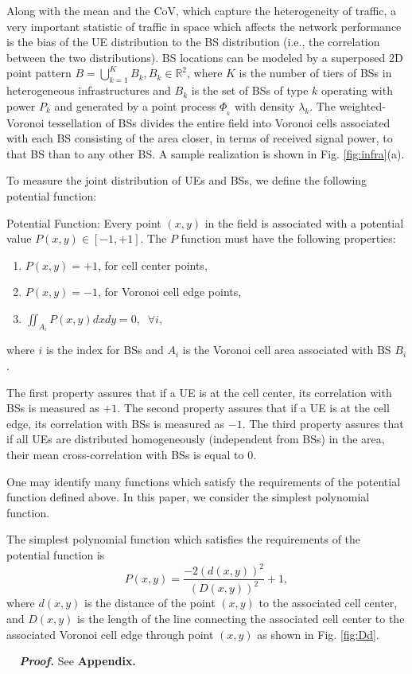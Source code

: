 \documentclass[journal]{IEEEtran}
\begin{document}
Along with the mean and the CoV, which capture the heterogeneity of traffic, a very important statistic of traffic in space which affects the network performance is the bias of the UE distribution to the BS distribution (i.e., the correlation between the two distributions). BS locations can be modeled by a superposed 2D point pattern $B = \bigcup_{k=1}^{K} B_k, B_k \in \mathbb{R}^{2}$, where $K$ is the number of tiers of BSs in heterogeneous infrastructures and $B_k$ is the set of BSs of type $k$ operating with power $P_k$ and generated by a point process $\Phi_{_{k}}$ with density $\lambda_k$. The weighted-Voronoi tessellation of BSs divides the entire field into Voronoi cells associated with each BS consisting of the area closer, in terms of received signal power, to that BS than to any other BS. A sample realization is shown in Fig. \ref{fig:infra}(a).

To measure the joint distribution of UEs and BSs, we define the following potential function:
\begin{definition}
Potential Function: Every point $(x,y)$ in the field is associated with a potential value $P(x,y) \in \left [ -1, +1 \right ]$. The $P$ function must have the following properties:
\begin{enumerate}
\item $P(x,y) = +1$, for cell center points, 
\item $P(x,y) = -1$, for Voronoi cell edge points,
\item $\iint_{A_{i}}P(x,y)dxdy = 0, \;\; \forall i$,
\end{enumerate}
where $i$ is the index for BSs and $A_{i}$ is the Voronoi cell area associated with BS $B_{i}$.
\end{definition} 

The first property assures that if a UE is at the cell center, its correlation with BSs is measured as $+1$. The second property assures that if a UE is at the cell edge, its correlation with BSs is measured as $-1$. The third property assures that if all UEs are distributed homogeneously (independent from BSs) in the area, their mean cross-correlation with BSs is equal to $0$.

One may identify many functions which satisfy the requirements of the potential function defined above. In this paper, we consider the simplest polynomial function.

\begin{lemma}
The simplest polynomial function which satisfies the requirements of the potential function is
\begin{equation}
\label{eq:potential}
P(x,y) = \frac{-2(d(x,y))^{2}}{(D(x,y))^{2}}+1,
\end{equation}
where $d(x,y)$ is the distance of the point $(x,y)$ to the associated cell center, and $D(x,y)$ is the length of the line connecting the associated cell center to the associated Voronoi cell edge through point $(x,y)$ as shown in Fig. \ref{fig:Dd}.
\end{lemma}
\textbf{\textit{~~Proof.}} See \textbf{Appendix.}
\end{document}
